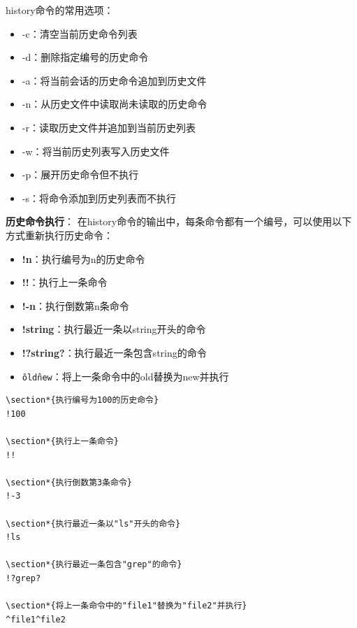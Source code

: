 \documentclass[12pt,UTF8]{ctexbook}
\begin{document}
history命令的常用选项：
\begin{itemize}
    \item -c：清空当前历史命令列表
    \item -d：删除指定编号的历史命令
    \item -a：将当前会话的历史命令追加到历史文件
    \item -n：从历史文件中读取尚未读取的历史命令
    \item -r：读取历史文件并追加到当前历史列表
    \item -w：将当前历史列表写入历史文件
    \item -p：展开历史命令但不执行
    \item -s：将命令添加到历史列表而不执行
\end{itemize}

\textbf{历史命令执行}：
在history命令的输出中，每条命令都有一个编号，可以使用以下方式重新执行历史命令：
\begin{itemize}
    \item \textbf{!n}：执行编号为n的历史命令
    \item \textbf{!!}：执行上一条命令
    \item \textbf{!-n}：执行倒数第n条命令
    \item \textbf{!string}：执行最近一条以string开头的命令
    \item \textbf{!?string?}：执行最近一条包含string的命令
    \item \texttt{\^old\^new}：将上一条命令中的old替换为new并执行
\end{itemize}

\begin{verbatim}
\section*{执行编号为100的历史命令}
!100

\section*{执行上一条命令}
!!

\section*{执行倒数第3条命令}
!-3

\section*{执行最近一条以"ls"开头的命令}
!ls

\section*{执行最近一条包含"grep"的命令}
!?grep?

\section*{将上一条命令中的"file1"替换为"file2"并执行}
^file1^file2
\end{verbatim}
\end{document}
